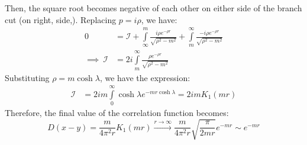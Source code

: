 Then, the square root becomes negative of each other on either side of the branch cut (on right, side,). Replacing $p=i\rho$, we have:
\begin{align*}
   0&= \mathcal{I}+\int\limits_\infty^m \frac{i\rho e^{-\rho r}}{\sqrt{\rho^2-m^2}} + \int\limits_{m}^\infty \frac{-i\rho e^{-\rho r}}{\sqrt{\rho^2-m^2}}  \\
\implies \ \mathcal{I} &= 2i\int\limits^\infty_m \frac{\rho e^{-\rho r}}{\sqrt{\rho^2-m^2}}
\end{align*}
Substituting $\rho = m\cosh \lambda $, we have the expression:
\begin{align*}
    \mathcal{I} &= 2im\int\limits^\infty_0 \cosh\lambda e^{-mr\cosh\lambda} = 2im K_1(mr) 
\end{align*}
Therefore, the final value of the correlation function becomes:
$$D(x-y) = \frac{m}{4\pi^2 r}K_1(mr)\xrightarrow{r\to \infty} \frac{m}{4\pi^2 r}\sqrt{ \frac{\pi}{2mr}}e^{-mr}\sim e^{-mr}$$
